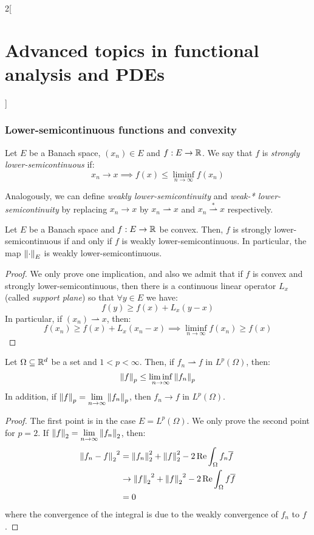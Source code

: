 \documentclass[../../../main_math.tex]{subfiles}
\begin{document}
\begin{multicols}{2}[\section{Advanced topics in functional analysis and PDEs}]
  \subsubsection{Lower-semicontinuous functions and convexity}
  \begin{definition}
    Let $E$ be a Banach space, $(x_n)\in E$ and $f:E\to\mathbb{R}$. We say that $f$ is \emph{strongly lower-semicontinuous} if:
    $$
      x_n\to x\implies f(x)\leq \liminf_{n\to\infty}{f(x_n)}
    $$
  \end{definition}
  \begin{remark}
    Analogously, we can define \emph{weakly lower-semicontinuity} and \emph{weak-* lower-semicontinuity} by replacing $x_n\to x$ by $x_n\rightharpoonup x$ and $x_n\overset{*}\rightharpoonup x$ respectively.
  \end{remark}
  \begin{theorem}\label{ATFAPDE:lower_semicontinuity_thm}
    Let $E$ be a Banach space and $f:E\to\mathbb{R}$ be convex. Then, $f$ is strongly lower-semicontinuous if and only if $f$ is weakly lower-semicontinuous. In particular, the map ${\left\|\cdot\right\|}_E$ is weakly lower-semicontinuous.
  \end{theorem}
  \begin{proof}
    We only prove one implication, and also we admit that if $f$ is convex and strongly lower-semicontinuous, then there is a continuous linear operator $L_x$ (called \emph{support plane}) so that $\forall y\in E$ we have:
    $$
      f(y)\geq f(x)+L_x(y-x)
    $$
    In particular, if $(x_n)\rightharpoonup x$, then:
    $$
      f(x_n)\geq f(x)+L_x(x_n-x)\implies \liminf_{n\to\infty}{f(x_n)}\geq f(x)
    $$
  \end{proof}
  \begin{theorem}
    Let $\Omega\subseteq \mathbb{R}^d$ be a set and $1<p<\infty$. Then, if $f_n\rightharpoonup f$ in $L^p(\Omega)$, then: $$\left\|f\right\|_p\leq \liminf_{n\to\infty}{\left\|f_n\right\|_p}$$ In addition, if $\displaystyle\left\|f\right\|_p=\lim_{n\to\infty}{\left\|f_n\right\|_p}$, then $f_n\to f$ in $L^p(\Omega)$.
  \end{theorem}
  \begin{proof}
    The first point is  in the case $E = L^p(\Omega)$. We only prove the second point for $p=2$. If $\displaystyle\left\|f\right\|_2=\lim_{n\to\infty}{\left\|f_n\right\|_2}$, then:
    \begin{align*}
      {\left\|f_n-f\right\|_2}^2 & =\left\|f_n\right\|_2^2+\left\|f\right\|_2^2-2\Re\int_\Omega f_n\overline{f}    \\
                         & \to {\left\|f\right\|_2}^2+{\left\|f\right\|_2}^2-2\Re\int_\Omega f\overline{f} \\
                         & =0
    \end{align*}
    where the convergence of the integral is due to the weakly convergence of $f_n$ to $f$.
  \end{proof}

\end{multicols}
\end{document}
